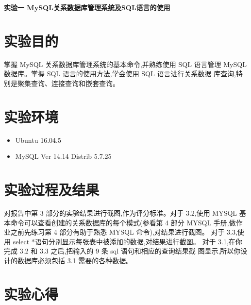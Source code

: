 \documentclass{ML}
\begin{document}
\maketitle

\newpage

\begin{center}
    \textbf{ 实验一 MySQL关系数据库管理系统及SQL语言的使用}
\end{center}

\section{实验目的}
    掌握 MySQL 关系数据库管理系统的基本命令,并熟练使用 SQL 语言管理
MySQL 数据库。掌握 SQL 语言的使用方法,学会使用 SQL 语言进行关系数据
库查询,特别是聚集查询、连接查询和嵌套查询。
\section{实验环境}
\begin{itemize}
    \item Ubuntu 16.04.5
    \item MySQL Ver 14.14 Distrib 5.7.25
\end{itemize}
\section{实验过程及结果}
对报告中第 3 部分的实验结果进行截图,作为评分标准。对于 3.2,使用
MYSQL 基本命令可以查看创建的关系数据库的每个模式(参看第 4 部分 MYSQL
手册,做作业之前先练习第 4 部分有助于熟悉 MYSQL 命令),对结果进行截图。
对于 3.3,使用 select *语句分别显示每张表中被添加的数据,对结果进行截图。
对于 3.1,在你完成 3.2 和 3.3 之后,把输入的 9 条 sql 语句和相应的查询结果截
图显示,所以你设计的数据库必须包括 3.1 需要的各种数据。
\section{实验心得}


\end{document}
